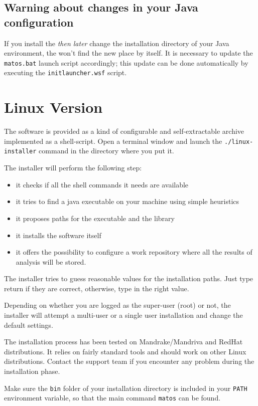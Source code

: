 \subsection*{Warning about changes in your Java configuration}
If you install the \ma \emph{then later} change the installation directory
of your Java environment, the \ma won't find the new place by itself. It is
necessary to update the \texttt{matos.bat} launch script accordingly; this update
can be done automatically by executing the \texttt{initlauncher.wsf} script.

\section{Linux Version}
The software is provided as a kind of configurable and self-extractable archive
implemented as a shell-script. Open a terminal window and launch the
\texttt{./linux-installer} command in the directory where you put it.

The installer will perform the following step:
\begin{itemize}
\item it checks if all the shell commands it needs are available
\item it tries to find a java executable on your machine using simple 
heuristics
\item it proposes paths for the executable and the \ma library
\item it installs the software itself
\item it offers the possibility to configure a work repository where all the
results of analysis will be stored.
\end{itemize}

The installer tries to guess reasonable values for the installation paths. Just
type return if they are correct, otherwise, type in the right value.

Depending on whether you are logged as the super-user (root) or not, the 
installer will attempt a multi-user or a single user installation and
change the default settings.

The installation process has been tested on Mandrake/Mandriva and RedHat 
distributions. It relies on fairly standard tools and should work on 
other Linux distributions. Contact the support
team if you encounter any problem during the installation phase.

Make sure the \texttt{bin} folder of your installation directory
is included in your \texttt{PATH} environment variable, so that the
main command \texttt{matos} can be found.

